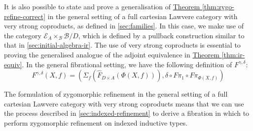 \documentclass{LMCS}
\newcommand{\thmref}[1]{\hyperref[#1]{Theorem \ref*{#1}}}
\begin{document}
It is also possible to state and prove a generalisation of
\thmref{thm:zygo-refine-correct} in the general setting of a full
cartesian Lawvere category with very strong coproducts, as defined in
\autoref{sec:families}. In this case, we make use of the category
$\mathcal{E}_A \times_{\mathcal{B}} \mathcal{B}/D$, which is defined
by a pullback construction similar to that in
\autoref{sec:initial-algebra-ir}. The use of very strong coproducts is
essential to proving the generalised analogue of the adjoint
equivalence in \thmref{thm:ir-equiv}. In the general fibrational
setting, we have the following definition of $F^{\gamma,\delta}$:
\begin{displaymath}
  F^{\gamma,\delta}(X,f) = (\Sigma_f(\hat{F}_{D \times A}(\Phi(X,f))), \delta \circ F\pi_1 \circ F\pi_{\Phi(X,f)})
\end{displaymath}

The formulation of zygomorphic refinement in the general setting of a
full cartesian Lawvere category with very strong coproducts means that
we can use the process described in \autoref{sec:indexed-refinement}
to derive a fibration in which to perform zygomorphic refinement on
indexed inductive types.
\end{document}
